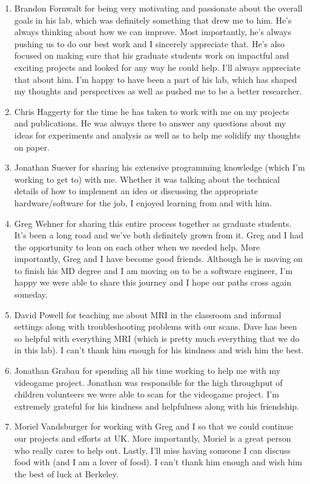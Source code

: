 \begin{enumerate}
	\item Brandon Fornwalt for being very motivating and passionate about the overall goals in his lab, which was definitely something that drew me to him. He's always thinking about how we can improve. Most importantly, he's always pushing us to do our best work and I sincerely appreciate that. He's also focused on making sure that his graduate students work on impactful and exciting projects and looked for any way he could help. I'll always appreciate that about him. I'm happy to have been a part of his lab, which has shaped my thoughts and perspectives as well as pushed me to be a better researcher.
	\item Chris Haggerty for the time he has taken to work with me on my projects and publications. He was always there to answer any questions about my ideas for experiments and analysis as well as to help me solidify my thoughts on paper.
	\item Jonathan Suever for sharing his extensive programming knowledge (which I'm working to get to) with me. Whether it was talking about the technical details of how to implement an idea or discussing the appropriate hardware/software for the job, I enjoyed learning from and with him.
	\item Greg Wehner for sharing this entire process together as graduate students. It's been a long road and we've both definitely grown from it. Greg and I had the opportunity to lean on each other when we needed help. More importantly, Greg and I have become good friends. Although he is moving on to finish his MD degree and I am moving on to be a software engineer, I'm happy we were able to share this journey and I hope our paths cross again someday.
	\item David Powell for teaching me about MRI in the classroom and informal settings along with troubleshooting problems with our scans. Dave has been so helpful with everything MRI (which is pretty much everything that we do in this lab). I can't thank him enough for his kindness and wish him the best.
	\item Jonathan Grabau for spending all his time working to help me with my videogame project. Jonathan was responsible for the high throughput of children volunteers we were able to scan for the videogame project. I'm extremely grateful for his kindness and helpfulness along with his friendship.
	\item Moriel Vandsburger for working with Greg and I so that we could continue our projects and efforts at UK. More importantly, Moriel is a great person who really cares to help out. Lastly, I'll miss having someone I can discuss food with (and I am a lover of food). I can't thank him enough and wish him the best of luck at Berkeley.

\end{enumerate}
